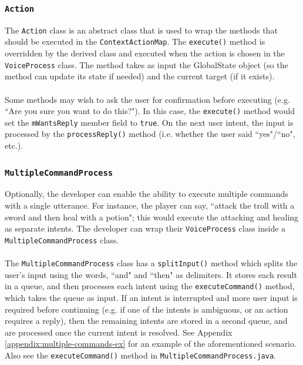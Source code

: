 \documentclass[11pt]{article}
\begin{document}
\subsubsection{\texttt{Action}}
\label{section:action}

The \texttt{Action} class is an abstract class that is used to wrap the methods that should be executed in the \texttt{ContextActionMap}. The \texttt{execute()} method is overridden by the derived class and executed when the action is chosen in the \texttt{VoiceProcess} class. The method takes as input the GlobalState object (so the method can update its state if needed) and the current target (if it exists).
\\
\\
Some methods may wish to ask the user for confirmation before executing (e.g. ``Are you sure you want to do this?"). In this case, the \texttt{execute()} method would set the \texttt{mWantsReply} member field to \texttt{true}. On the next user intent, the input is processed by the \texttt{processReply()} method (i.e. whether the user said ``yes"/``no", etc.).

\subsubsection{\texttt{MultipleCommandProcess}}

Optionally, the developer can enable the ability to execute multiple commands with a single utterance. For instance, the player can say, ``attack the troll with a sword and then heal with a potion"; this would execute the attacking and healing as separate intents. The developer can wrap their \texttt{VoiceProcess} class inside a \texttt{MultipleCommandProcess} class.
\\
\\
The \texttt{MultipleCommandProcess} class has a \texttt{splitInput()} method which splits the user's input using the words, ``and" and ``then" as delimiters. It stores each result in a queue, and then processes each intent using the \texttt{executeCommand()} method, which takes the queue as input. If an intent is interrupted and more user input is required before continuing (e.g. if one of the intents is ambiguous, or an action requires a reply), then the remaining intents are stored in a second queue, and are processed once the current intent is resolved. See Appendix \ref{appendix:multiple-commands-ex} for an example of the aforementioned scenario. Also see the \texttt{executeCommand()} method in \texttt{MultipleCommandProcess.java}.
\end{document}
